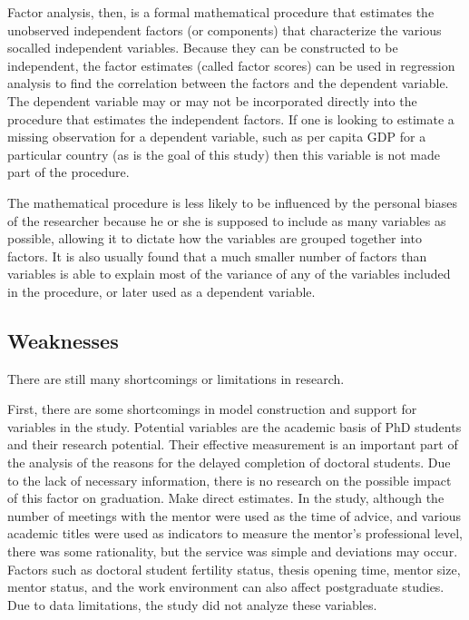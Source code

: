 \documentclass{mcmthesis}
\begin{document}
Factor analysis, then, is a formal mathematical procedure that estimates the
unobserved independent factors (or components) that characterize the various
socalled independent variables. Because they can be constructed to be
independent, the factor estimates (called factor scores) can be used in
regression analysis to find the correlation between the factors and the
dependent variable. The dependent variable may or may not be incorporated
directly into the procedure that estimates the independent factors. If one is
looking to estimate a missing observation for a dependent variable, such as per
capita GDP for a particular country (as is the goal of this study) then this
variable is not made part of the procedure.

The mathematical procedure is less likely to be influenced by the personal
biases of the researcher because he or she is supposed to include as many
variables as possible, allowing it to dictate how the variables are grouped
together into factors. It is also usually found that a much smaller number of
factors than variables is able to explain most of the variance of any of the
variables included in the procedure, or later used as a dependent variable.

\subsection{Weaknesses}%
\label{sub:Weaknesses}

There are still many shortcomings or limitations in research.

First, there are some shortcomings in model construction and support for
variables in the study.  Potential variables are the academic basis of PhD
students and their research potential. Their effective measurement is an
important part of the analysis of the reasons for the delayed completion of
doctoral students. Due to the lack of necessary information, there is no
research on the possible impact of this factor on graduation. Make direct
estimates. In the study, although the number of meetings with the mentor were
used as the time of advice, and various academic titles were used as indicators
to measure the mentor's professional level, there was some rationality, but the
service was simple and deviations may occur. Factors such as doctoral student
fertility status, thesis opening time, mentor size, mentor status, and the work
environment can also affect postgraduate studies. Due to data limitations, the
study did not analyze these variables.
\end{document}
